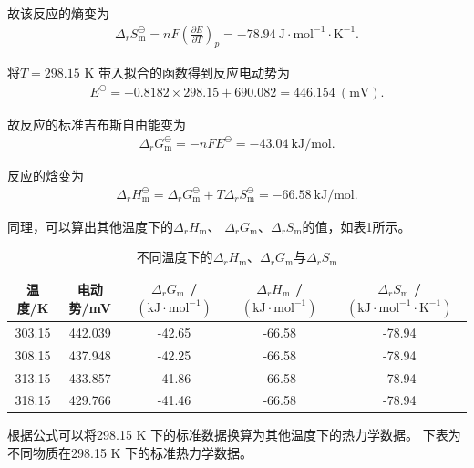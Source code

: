 \documentclass[12pt]{ctexart}
\numberwithin{equation}{section}
\begin{document}
故该反应的熵变为
\begin{align}
    \Delta_r S_\text{m}^\ominus = nF
    \left(\frac{\partial E}{\partial T}\right)_p
    =-78.94~\mathrm{J\cdot mol^{-1}\cdot K^{-1}}. \tag{I.14}
\end{align}

将$T = 298.15$ K 带入拟合的函数得到反应电动势为
\begin{align}
    E^\ominus = -0.8182 \times 298.15 + 690.082 = 446.154
    ~\mathrm{(mV)}. \tag{I.15}
\end{align}

故反应的标准吉布斯自由能变为
\begin{align}
    \Delta_r G_\text{m}^\ominus = -nFE^\ominus = -43.04
    ~\mathrm{kJ/mol}. \tag{I.16}
\end{align}

反应的焓变为
\begin{align}
    \Delta_r H_\text{m}^\ominus = \Delta_r G_\text{m}^\ominus
        + T \Delta_r S_\text{m}^\ominus = -66.58
    ~\mathrm{kJ/mol}. \tag{I.17}
\end{align}

同理，可以算出其他温度下的$\Delta_r H_\text{m}$、
$\Delta_r G_\text{m}$、$\Delta_r S_\text{m}$的值，如表1所示。

\begin{longtable}{ccccc}
    \caption{不同温度下的$\Delta_r H_\text{m}$、$\Delta_r G_\text{m}$与$\Delta_r S_\text{m}$} \\
    \hline
    温度/K & 电动势/mV & $\Delta_r G_\text{m}$ / $\mathrm{(kJ\cdot mol^{-1})}$ & $\Delta_r H_\text{m}$ / $\mathrm{(kJ\cdot mol^{-1})}$ & $\Delta_r S_\text{m}$ / $\mathrm{(kJ\cdot mol^{-1}\cdot K^{-1})}$ \\
    \hline
    303.15 & 442.039 & -42.65 & -66.58 & -78.94 \\
    308.15 & 437.948 & -42.25 & -66.58 & -78.94 \\
    313.15 & 433.857 & -41.86 & -66.58 & -78.94 \\
    318.15 & 429.766 & -41.46 & -66.58 & -78.94 \\
    \hline
\end{longtable}

根据公式可以将298.15 K 下的标准数据换算为其他温度下的热力学数据。
下表为不同物质在298.15 K 下的标准热力学数据。
\end{document}
